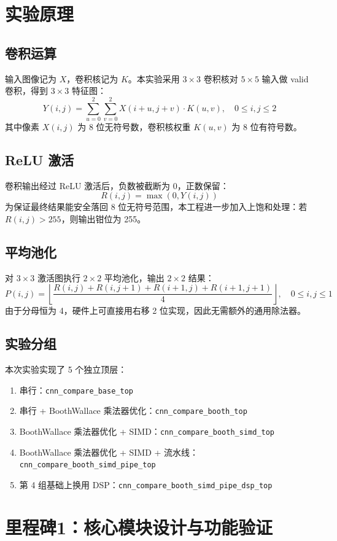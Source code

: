 \documentclass{article}
\begin{document}
\section{实验原理}
\subsection{卷积运算}
输入图像记为 $X$，卷积核记为 $K$。本实验采用 $3\times 3$ 卷积核对 $5\times 5$ 输入做 valid 卷积，得到 $3\times 3$ 特征图：
\[
Y(i,j)=\sum_{u=0}^{2}\sum_{v=0}^{2} X(i+u,j+v)\cdot K(u,v),\quad 0\le i,j\le 2
\]
其中像素 $X(i,j)$ 为 8 位无符号数，卷积核权重 $K(u,v)$ 为 8 位有符号数。

\subsection{ReLU 激活}
卷积输出经过 ReLU 激活后，负数被截断为 0，正数保留：
\[
R(i,j)=\max(0,Y(i,j))
\]
为保证最终结果能安全落回 8 位无符号范围，本工程进一步加入上饱和处理：若 $R(i,j)>255$，则输出钳位为 255。

\subsection{平均池化}
对 $3\times 3$ 激活图执行 $2\times 2$ 平均池化，输出 $2\times 2$ 结果：
\[
P(i,j)=\left\lfloor \frac{R(i,j)+R(i,j+1)+R(i+1,j)+R(i+1,j+1)}{4}\right\rfloor,\quad 0\le i,j\le 1
\]
由于分母恒为 4，硬件上可直接用右移 2 位实现，因此无需额外的通用除法器。

\subsection{实验分组}
本次实验实现了 5 个独立顶层：
\begin{enumerate}
  \item 串行：\texttt{cnn\_compare\_base\_top}
  \item 串行 + BoothWallace 乘法器优化：\texttt{cnn\_compare\_booth\_top}
  \item BoothWallace 乘法器优化 + SIMD：\texttt{cnn\_compare\_booth\_simd\_top}
  \item BoothWallace 乘法器优化 + SIMD + 流水线：\texttt{cnn\_compare\_booth\_simd\_pipe\_top}
  \item 第 4 组基础上换用 DSP：\texttt{cnn\_compare\_booth\_simd\_pipe\_dsp\_top}
\end{enumerate}

\section{里程碑1：核心模块设计与功能验证}
\end{document}
